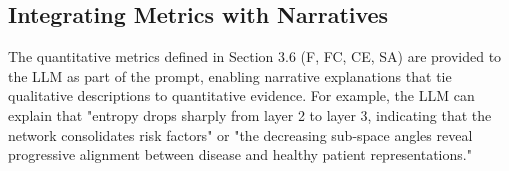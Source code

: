 % 
% 
% 
% 
% 


\subsection{Integrating Metrics with Narratives}

The quantitative metrics defined in Section 3.6 (F, FC, CE, SA) are provided to the LLM as part of the prompt, enabling narrative explanations that tie qualitative descriptions to quantitative evidence. For example, the LLM can explain that "entropy drops sharply from layer 2 to layer 3, indicating that the network consolidates risk factors" or "the decreasing sub-space angles reveal progressive alignment between disease and healthy patient representations."



